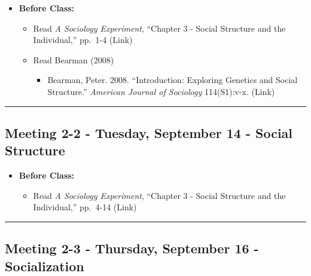\documentclass[
]{book}
\providecommand{\tightlist}{%
  \setlength{\itemsep}{0pt}\setlength{\parskip}{0pt}}
\begin{document}
\begin{itemize}
\tightlist
\item
  \textbf{Before Class:}

  \begin{itemize}
  \tightlist
  \item
    Read \emph{A Sociology Experiment}, ``Chapter 3 - Social Structure and the Individual,'' pp.~1-4 (Link)
  \item
    Read Bearman (2008)

    \begin{itemize}
    \tightlist
    \item
      Bearman, Peter. 2008. ``Introduction: Exploring Genetics and Social Structure.'' \emph{American Journal of Sociology} 114(S1):v-x. (Link)
    \end{itemize}
  \end{itemize}
\end{itemize}

\begin{center}\rule{0.5\linewidth}{0.5pt}\end{center}

\hypertarget{meeting-2-2---tuesday-september-14---social-structure}{%
\subsection*{Meeting 2-2 - Tuesday, September 14 - Social Structure}\label{meeting-2-2---tuesday-september-14---social-structure}}

\begin{itemize}
\tightlist
\item
  \textbf{Before Class:}

  \begin{itemize}
  \tightlist
  \item
    Read \emph{A Sociology Experiment}, ``Chapter 3 - Social Structure and the Individual,'' pp.~4-14 (Link)
  \end{itemize}
\end{itemize}

\begin{center}\rule{0.5\linewidth}{0.5pt}\end{center}

\hypertarget{meeting-2-3---thursday-september-16---socialization}{%
\subsection*{Meeting 2-3 - Thursday, September 16 - Socialization}\label{meeting-2-3---thursday-september-16---socialization}}
\end{document}
